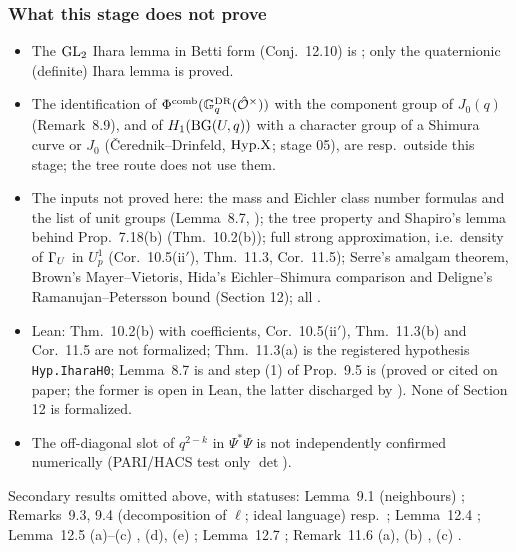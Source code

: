 \subsubsection*{What this stage does not prove}
\begin{itemize}
\item The $\mathrm{GL}_2$ Ihara lemma in Betti form (Conj.~12.10) is \stexp{}; only the quaternionic (definite) Ihara lemma is proved.
\item The identification of $\Phi^{\mathrm{comb}}(\mathbb{G}^{\mathrm{DR}}_q(\hat{\mathcal{O}}^\times))$ with the component group of $J_0(q)$ (Remark~8.9), and of $H_1(\mathrm{BG}(U,q))$ with a character group of a
  Shimura curve or $J_0$ (\v{C}erednik--Drinfeld, $\mathrm{Hyp.X}$; stage 05), are \stcited{} resp.\ outside this stage; the tree route does not use them.
\item The inputs not proved here: the mass and Eichler class number formulas and the list of unit groups (Lemma~8.7, \stcited); the tree property and
  Shapiro's lemma behind Prop.~7.18(b) (Thm.~10.2(b)); full strong approximation, i.e.\ density of $\Gamma_U$ in $U^1_p$ (Cor.~10.5(ii$'$), Thm.~11.3, Cor.~11.5);
  Serre's amalgam theorem, Brown's Mayer--Vietoris, Hida's Eichler--Shimura comparison and Deligne's Ramanujan--Petersson bound (Section 12); all \stcited.
\item Lean: Thm.~10.2(b) with coefficients, Cor.~10.5(ii$'$), Thm.~11.3(b) and Cor.~11.5 are not formalized; Thm.~11.3(a) is the registered hypothesis
  \texttt{Hyp.IharaH0}; Lemma~8.7 is  and step (1) of Prop.~9.5 is  (proved or cited on paper; the former is open in Lean, the latter discharged by \BSFdischargeName).
  None of Section 12 is formalized.
\item The off-diagonal slot of $q^{2-k}$ in $\Psi^*\Psi$ is not independently confirmed numerically (PARI/HACS test only $\det$).
\end{itemize}
Secondary results omitted above, with statuses: Lemma~9.1 (neighbours) \stproved; Remarks~9.3, 9.4 (decomposition of $\ell$; ideal language) \stproved{} resp.\
\stpmc; Lemma~12.4 \stpmc; Lemma~12.5 (a)--(c) \stproved, (d), (e) \stpmc; Lemma~12.7 \stpmc; Remark~11.6 (a), (b) \stpmc, (c) \stcomp.
